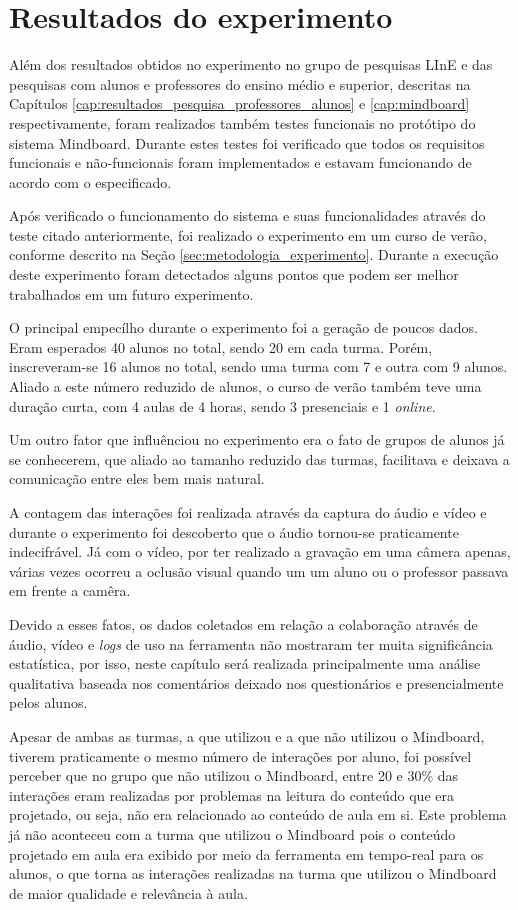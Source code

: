 \chapter{Resultados do experimento}
\label{cap:resultados}

Além dos resultados obtidos no experimento no grupo de pesquisas LInE e das pesquisas com alunos e professores do ensino médio e superior, descritas na Capítulos \ref{cap:resultados_pesquisa_professores_alunos} e \ref{cap:mindboard} respectivamente, foram realizados também testes funcionais no protótipo do sistema Mindboard. Durante estes testes foi verificado que todos os requisitos funcionais e não-funcionais foram implementados e estavam funcionando de acordo com o especificado. 

Após verificado o funcionamento do sistema e suas funcionalidades através do teste citado anteriormente, foi realizado o experimento em um curso de verão, conforme descrito na Seção \ref{sec:metodologia_experimento}. Durante a execução deste experimento foram detectados alguns pontos que podem ser melhor trabalhados em um futuro experimento. 

O principal empecílho durante o experimento foi a geração de poucos dados. Eram esperados 40 alunos no total, sendo 20 em cada turma. Porém, inscreveram-se 16 alunos no total, sendo uma turma com 7 e outra com 9 alunos. Aliado a este número reduzido de alunos, o curso de verão também teve uma duração curta, com 4 aulas de 4 horas, sendo 3 presenciais e 1 \emph{online}.

Um outro fator que influênciou no experimento era o fato de grupos de alunos já se conhecerem, que aliado ao tamanho reduzido das turmas, facilitava e deixava a comunicação entre eles bem mais natural.

A contagem das interações foi realizada através da captura do áudio e vídeo e durante o experimento foi descoberto que o áudio tornou-se praticamente indecifrável. Já com o vídeo, por ter realizado a gravação em uma câmera apenas, várias vezes ocorreu a oclusão visual quando um um aluno ou o professor passava em frente a camêra.

Devido a esses fatos, os dados coletados em relação a colaboração através de áudio, vídeo e \emph{logs} de uso na ferramenta não mostraram ter muita significância estatística, por isso, neste capítulo será realizada principalmente uma análise qualitativa baseada nos comentários deixado nos questionários e presencialmente pelos alunos.

Apesar de ambas as turmas, a que utilizou e a que não utilizou o Mindboard, tiverem praticamente o mesmo número de interações por aluno, foi possível perceber que no grupo que não utilizou o Mindboard, entre 20 e 30\% das interações eram realizadas por problemas na leitura do conteúdo que era projetado, ou seja, não era relacionado ao conteúdo de aula em si. Este problema já não aconteceu com a turma que utilizou o Mindboard pois o conteúdo projetado em aula era exibido por meio da ferramenta em tempo-real para os alunos, o que torna as interações realizadas na turma que utilizou o Mindboard de maior qualidade e relevância à aula.

